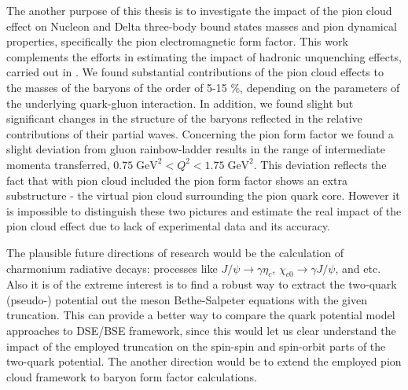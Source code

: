 The another purpose of this thesis is to investigate the impact of the pion cloud effect on Nucleon and Delta three-body bound states masses and pion dynamical properties, specifically the pion electromagnetic form factor. This work complements the efforts in estimating the impact of hadronic unquenching effects, carried out in \cite{Fischer:2007ze,Fischer:2008sp,Fischer:2008wy}. We found substantial contributions of the pion cloud effects to the masses of the baryons of the order of 5-15 \%, depending on the parameters of the underlying quark-gluon interaction.
In addition, we found slight but significant changes in the structure of the baryons reflected in the relative contributions of their partial waves.
Concerning the pion form factor we found a slight deviation from gluon rainbow-ladder results in the range of intermediate momenta transferred, $0.75\; \text{GeV}^2 < Q^2 < 1.75\; \text{GeV}^2$. This deviation reflects the fact that with pion cloud included the pion form factor shows an extra substructure - the virtual pion cloud surrounding the pion quark core. However it is impossible to distinguish these two pictures and estimate the real impact of the pion cloud effect due to lack of experimental data and its accuracy. \\
\vspace{-0.3cm}

The plausible future directions of research would be the calculation of charmonium radiative decays: processes like $J/\psi \rightarrow \gamma \eta_c$, $\chi_{c0} \rightarrow \gamma J/\psi$, and etc. Also it is of the extreme interest is to find a robust way to extract the two-quark (pseudo-) potential out the meson Bethe-Salpeter equations with the given truncation. This can provide a better way to compare the quark potential model approaches to DSE/BSE framework, since this would let us clear understand the impact of the employed truncation on the spin-spin and spin-orbit parts of the two-quark potential. The another direction would be to extend the employed pion cloud framework to baryon form factor calculations.

